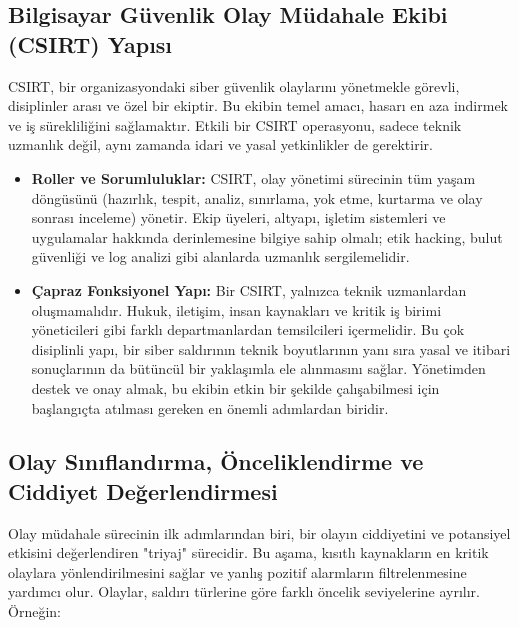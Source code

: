 \subsection{Bilgisayar Güvenlik Olay Müdahale Ekibi (CSIRT) Yapısı}

CSIRT, bir organizasyondaki siber güvenlik olaylarını yönetmekle görevli, disiplinler arası ve özel bir ekiptir. Bu ekibin temel amacı, hasarı en aza indirmek ve iş sürekliliğini sağlamaktır. Etkili bir CSIRT operasyonu, sadece teknik uzmanlık değil, aynı zamanda idari ve yasal yetkinlikler de gerektirir.

\begin{itemize}
    \item \textbf{Roller ve Sorumluluklar:} CSIRT, olay yönetimi sürecinin tüm yaşam döngüsünü (hazırlık, tespit, analiz, sınırlama, yok etme, kurtarma ve olay sonrası inceleme) yönetir. Ekip üyeleri, altyapı, işletim sistemleri ve uygulamalar hakkında derinlemesine bilgiye sahip olmalı; etik hacking, bulut güvenliği ve log analizi gibi alanlarda uzmanlık sergilemelidir.

    \item \textbf{Çapraz Fonksiyonel Yapı:} Bir CSIRT, yalnızca teknik uzmanlardan oluşmamalıdır. Hukuk, iletişim, insan kaynakları ve kritik iş birimi yöneticileri gibi farklı departmanlardan temsilcileri içermelidir. Bu çok disiplinli yapı, bir siber saldırının teknik boyutlarının yanı sıra yasal ve itibari sonuçlarının da bütüncül bir yaklaşımla ele alınmasını sağlar. Yönetimden destek ve onay almak, bu ekibin etkin bir şekilde çalışabilmesi için başlangıçta atılması gereken en önemli adımlardan biridir.
\end{itemize}

\subsection{Olay Sınıflandırma, Önceliklendirme ve Ciddiyet Değerlendirmesi}

Olay müdahale sürecinin ilk adımlarından biri, bir olayın ciddiyetini ve potansiyel etkisini değerlendiren "triyaj" sürecidir. Bu aşama, kısıtlı kaynakların en kritik olaylara yönlendirilmesini sağlar ve yanlış pozitif alarmların filtrelenmesine yardımcı olur. Olaylar, saldırı türlerine göre farklı öncelik seviyelerine ayrılır. Örneğin:

